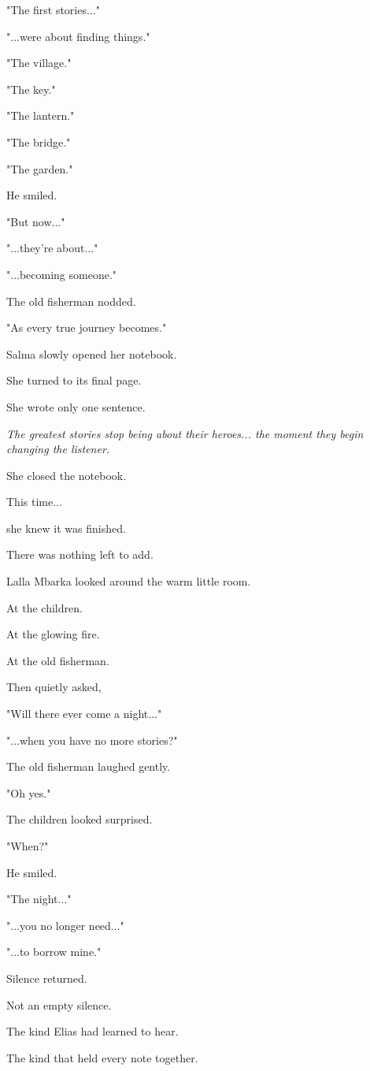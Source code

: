 \documentclass[12pt,openany]{book}
\begin{document}
"The first stories..."

"...were about finding things."

"The village."

"The key."

"The lantern."

"The bridge."

"The garden."

He smiled.

"But now..."

"...they're about..."

"...becoming someone."

The old fisherman nodded.

"As every true journey becomes."

Salma slowly opened her notebook.

She turned to its final page.

She wrote only one sentence.

\emph{The greatest stories stop being about their heroes... the moment they begin changing the listener.}

She closed the notebook.

This time...

she knew it was finished.

There was nothing left to add.

Lalla Mbarka looked around the warm little room.

At the children.

At the glowing fire.

At the old fisherman.

Then quietly asked,

"Will there ever come a night..."

"...when you have no more stories?"

The old fisherman laughed gently.

"Oh yes."

The children looked surprised.

"When?"

He smiled.

"The night..."

"...you no longer need..."

"...to borrow mine."

Silence returned.

Not an empty silence.

The kind Elias had learned to hear.

The kind that held every note together.
\end{document}
